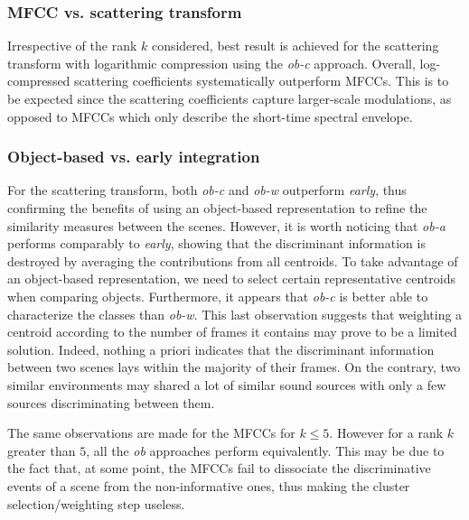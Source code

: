 \documentclass[journal]{IEEEtran}
\makeatletter
\newcommand*{\vs}{vs.\@\xspace}
\makeatother
\begin{document}
\subsubsection*{MFCC \vs scattering transform}

Irrespective of the rank $k$ considered, best result is achieved for the scattering transform with logarithmic compression using the \emph{ob-c} approach. Overall, log-compressed scattering coefficients systematically outperform MFCCs. This is to be expected since the scattering coefficients capture larger-scale modulations, as opposed to MFCCs which only describe the short-time spectral envelope.

\subsubsection*{Object-based \vs early integration}

For the scattering transform, both \emph{ob-c} and \emph{ob-w} outperform \emph{early}, thus confirming the benefits of using an object-based representation to refine the similarity measures between the scenes. However, it is worth noticing that \emph{ob-a} performs comparably to \emph{early}, showing that the discriminant information is destroyed by averaging the contributions from all centroids. To take advantage of an object-based representation, we need to select certain representative centroids when comparing objects. Furthermore, it appears that \emph{ob-c} is better able to characterize the classes than \emph{ob-w}. This last observation suggests that weighting a centroid according to the number of frames it contains may prove to be a limited solution. Indeed, nothing a priori indicates that the discriminant information between two scenes lays within the majority of their frames. On the contrary, two similar environments may shared a lot of similar sound sources with only a few sources discriminating between them.

The same observations are made for the MFCCs for $k\leq5$. However for a rank $k$ greater than $5$, all the \emph{ob} approaches perform equivalently. This may be due to the fact that, at some point, the MFCCs fail to dissociate the discriminative events of a scene from the non-informative ones, thus making the cluster selection/weighting step useless.
	
\end{document}
